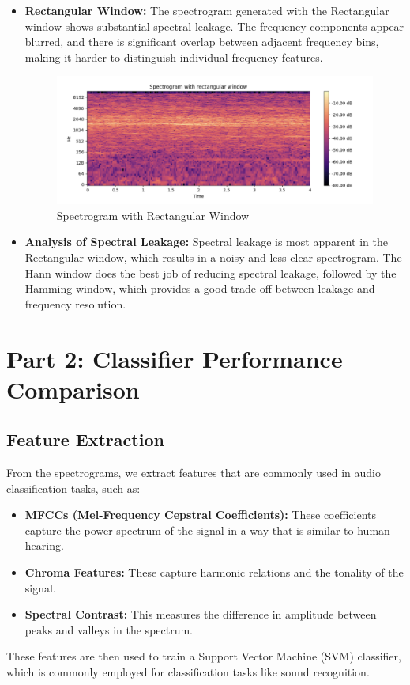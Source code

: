 \documentclass[a4paper,12pt]{article}
\begin{document}
\begin{itemize}
\item\textbf{Rectangular Window:} The spectrogram generated with the Rectangular window shows substantial spectral leakage. The frequency components appear blurred, and there is significant overlap between adjacent frequency bins, making it harder to distinguish individual frequency features.
\begin{figure}[H]
    \centering
    \includegraphics[width=1\linewidth]{RectangularWindow.png}
    \caption{Spectrogram with Rectangular Window}
    \label{fig:enter-label}
\end{figure}

\item \textbf{Analysis of Spectral Leakage:} Spectral leakage is most apparent in the Rectangular window, which results in a noisy and less clear spectrogram. The Hann window does the best job of reducing spectral leakage, followed by the Hamming window, which provides a good trade-off between leakage and frequency resolution.
\end{itemize}
\newpage
\section{Part 2: Classifier Performance Comparison}

\subsection{Feature Extraction}
From the spectrograms, we extract features that are commonly used in audio classification tasks, such as:
\begin{itemize}
    \item \textbf{MFCCs (Mel-Frequency Cepstral Coefficients):} These coefficients capture the power spectrum of the signal in a way that is similar to human hearing.
    \item \textbf{Chroma Features:} These capture harmonic relations and the tonality of the signal.
    \item \textbf{Spectral Contrast:} This measures the difference in amplitude between peaks and valleys in the spectrum.
\end{itemize}
These features are then used to train a Support Vector Machine (SVM) classifier, which is commonly employed for classification tasks like sound recognition.
\end{document}
